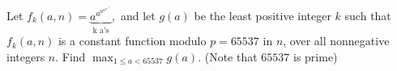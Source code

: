Let $f_k(a, n) = \underbrace{a^{a^{a^{a^{a^{...^{a^n}}}}}}}_{\text{k a's}},$ and let $g(a)$ be the least positive integer $k$ such that $f_k(a, n)$ is a constant function modulo $p = 65537$ in $n$, over all nonnegative integers $n.$ Find $\max_{1 \leq a < 65537} g(a).$ (Note that $65537$ is prime)
